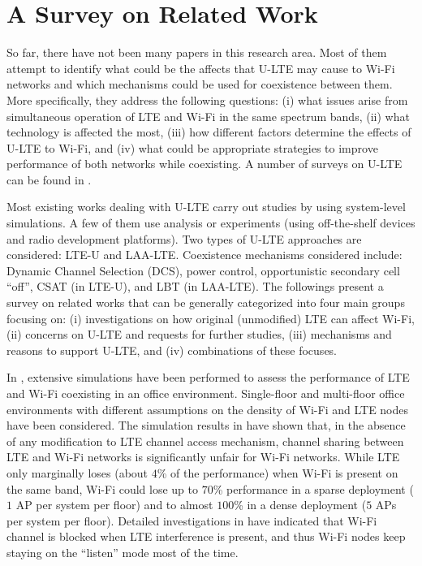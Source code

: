 \documentclass[12pt,onecolumn]{article}
\begin{document}

\section{A Survey on Related Work}
\label{sec:relatedwork}

\noindent So far, there have not been many papers in this research area. Most of them attempt to identify what could be the affects that U-LTE may cause to Wi-Fi networks and which mechanisms could be used for coexistence between them. More specifically, they address the following questions: (i) what issues arise from simultaneous operation of LTE and Wi-Fi in the same spectrum bands, (ii) what technology is affected the most, (iii) how different factors determine the effects of U-LTE to Wi-Fi, and (iv) what could be appropriate strategies to improve performance of both networks while coexisting. A number of surveys on U-LTE can be found in \cite{U-LTE-survey-2014, U-LTE-survey-2015, U-LTE-5G-2015}.

Most existing works dealing with U-LTE carry out studies by using system-level simulations. A few of them use analysis or experiments (using off-the-shelf devices and radio development platforms). Two types of U-LTE approaches are considered: LTE-U and LAA-LTE. Coexistence mechanisms considered include: Dynamic Channel Selection (DCS), power control, opportunistic secondary cell ``off'', CSAT (in LTE-U), and LBT (in LAA-LTE). The followings present a survey on related works that can be generally categorized into four main groups focusing on: (i) investigations on how original (unmodified) LTE can affect Wi-Fi, (ii) concerns on U-LTE and requests for further studies, (iii) mechanisms and reasons to support U-LTE, and (iv) combinations of these focuses.

In \cite{original-LTE-Wi-Fi-VTC-2013}, extensive simulations have been performed to assess the performance of LTE and Wi-Fi coexisting in an office environment. Single-floor and multi-floor office environments with different assumptions on the density of Wi-Fi and LTE nodes have been considered. The simulation results in \cite{original-LTE-Wi-Fi-VTC-2013} have shown that, in the absence of any modification to LTE channel access mechanism, channel sharing between LTE and Wi-Fi networks is significantly unfair for Wi-Fi networks. While LTE only marginally loses (about $4$\% of the performance) when Wi-Fi is present on the same band, Wi-Fi could lose up to $70$\% performance in a sparse deployment ($1$ AP per system per floor) and to almost $100$\% in a dense deployment ($5$ APs per system per floor). Detailed investigations in \cite{original-LTE-Wi-Fi-VTC-2013} have indicated that Wi-Fi channel is blocked when LTE interference is present, and thus Wi-Fi nodes keep staying on the ``listen'' mode most of the time.
\end{document}
